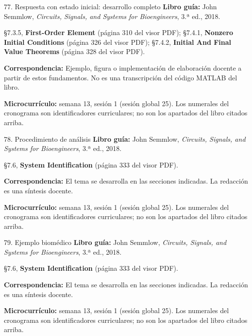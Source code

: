 \documentclass[
  10pt,
  ignorenonframetext,
  aspectratio=169,
  spanish,
]{beamer}
\begin{document}
\begin{frame}{77. Respuesta con estado inicial: desarrollo completo}
\label{respuesta-con-estado-inicial-desarrollo-completo}
\textbf{Libro guía:} John Semmlow, \emph{Circuits, Signals, and Systems
for Bioengineers}, 3.ª ed., 2018.

§7.3.5, \textbf{First-Order Element} (página 310 del visor PDF); §7.4.1,
\textbf{Nonzero Initial Conditions} (página 326 del visor PDF); §7.4.2,
\textbf{Initial And Final Value Theorems} (página 328 del visor PDF).

\textbf{Correspondencia:} Ejemplo, figura o implementación de
elaboración docente a partir de estos fundamentos. No es una
transcripción del código MATLAB del libro.

\textbf{Microcurrículo:} semana 13, sesión 1 (sesión global 25). Los
numerales del cronograma son identificadores curriculares; no son los
apartados del libro citados arriba.
\end{frame}

\begin{frame}{78. Procedimiento de análisis}
\label{procedimiento-de-anuxe1lisis-4}
\textbf{Libro guía:} John Semmlow, \emph{Circuits, Signals, and Systems
for Bioengineers}, 3.ª ed., 2018.

§7.6, \textbf{System Identification} (página 333 del visor PDF).

\textbf{Correspondencia:} El tema se desarrolla en las secciones
indicadas. La redacción es una síntesis docente.

\textbf{Microcurrículo:} semana 13, sesión 1 (sesión global 25). Los
numerales del cronograma son identificadores curriculares; no son los
apartados del libro citados arriba.
\end{frame}

\begin{frame}{79. Ejemplo biomédico}
\label{ejemplo-biomuxe9dico-4}
\textbf{Libro guía:} John Semmlow, \emph{Circuits, Signals, and Systems
for Bioengineers}, 3.ª ed., 2018.

§7.6, \textbf{System Identification} (página 333 del visor PDF).

\textbf{Correspondencia:} El tema se desarrolla en las secciones
indicadas. La redacción es una síntesis docente.

\textbf{Microcurrículo:} semana 13, sesión 1 (sesión global 25). Los
numerales del cronograma son identificadores curriculares; no son los
apartados del libro citados arriba.
\end{frame}
\end{document}
